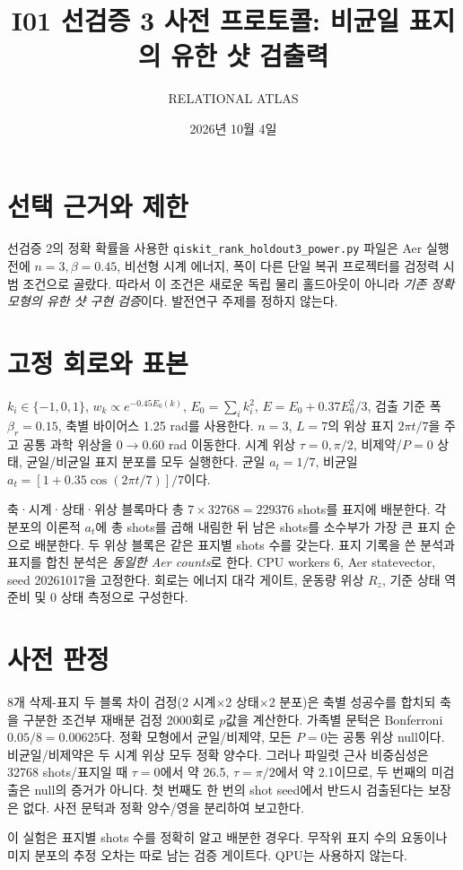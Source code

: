 \documentclass[11pt,a4paper]{article}
\title{I01 선검증 3 사전 프로토콜: 비균일 표지의 유한 샷 검출력}
\author{RELATIONAL ATLAS}
\date{2026년 10월 4일}
\begin{document}
\maketitle

\section{선택 근거와 제한}
선검증 2의 정확 확률을 사용한 \texttt{qiskit\_rank\_holdout3\_power.py}
파일은 Aer 실행 전에 $n=3,\beta=0.45$, 비선형 시계 에너지,
폭이 다른 단일 복귀 프로젝터를 검정력 시범 조건으로 골랐다.
따라서 이 조건은 새로운 독립 물리 홀드아웃이 아니라 \emph{기존
정확 모형의 유한 샷 구현 검증}이다. 발전연구 주제를 정하지 않는다.

\section{고정 회로와 표본}
$k_i\in\{-1,0,1\}$, $w_k\propto e^{-0.45E_0(k)}$,
$E_0=\sum_i k_i^2$, $E=E_0+0.37E_0^2/3$,
검출 기준 폭 $\beta_r=0.15$, 축별 바이어스 1.25 rad를 사용한다.
$n=3$, $L=7$의 위상 표지 $2\pi t/7$을 주고 공통 과학 위상을
$0\to0.60$ rad 이동한다. 시계 위상 $\tau=0,\pi/2$,
비제약/$P=0$ 상태, 균일/비균일 표지 분포를 모두 실행한다.
균일 $a_t=1/7$, 비균일
$a_t=[1+0.35\cos(2\pi t/7)]/7$이다.

축·시계·상태·위상 블록마다 총 $7\times32768=229376$ shots를
표지에 배분한다. 각 분포의 이론적 $a_t$에 총 shots를 곱해 내림한 뒤
남은 shots를 소수부가 가장 큰 표지 순으로 배분한다. 두 위상 블록은
같은 표지별 shots 수를 갖는다. 표지 기록을 쓴 분석과 표지를
합친 분석은 \emph{동일한 Aer counts}로 한다. CPU workers 6,
Aer statevector, seed 20261017을 고정한다. 회로는 에너지 대각 게이트,
운동량 위상 $R_z$, 기준 상태 역준비 및 0 상태 측정으로 구성한다.

\section{사전 판정}
8개 삭제-표지 두 블록 차이 검정(2 시계$\times$2 상태$\times$2 분포)은
축별 성공수를 합치되 축을 구분한 조건부 재배분 검정 2000회로
$p$값을 계산한다. 가족별 문턱은 Bonferroni $0.05/8=0.00625$다.
정확 모형에서 균일/비제약, 모든 $P=0$는 공통 위상 null이다.
비균일/비제약은 두 시계 위상 모두 정확 양수다.
그러나 파일럿 근사 비중심성은 32768 shots/표지일 때
$\tau=0$에서 약 26.5, $\tau=\pi/2$에서 약 2.1이므로,
두 번째의 미검출은 null의 증거가 아니다. 첫 번째도 한 번의
shot seed에서 반드시 검출된다는 보장은 없다. 사전 문턱과
정확 양수/영을 분리하여 보고한다.

이 실험은 표지별 shots 수를 정확히 알고 배분한 경우다.
무작위 표지 수의 요동이나 미지 분포의 추정 오차는 따로 남는 검증
게이트다. QPU는 사용하지 않는다.
\end{document}

